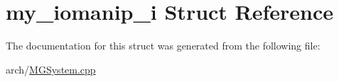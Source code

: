 \hypertarget{structmy__iomanip__i}{\section{my\+\_\+iomanip\+\_\+i Struct Reference}
\label{structmy__iomanip__i}
}


The documentation for this struct was generated from the following file\+:\begin{DoxyCompactItemize}
\item 
arch/\hyperlink{_m_g_system_8cpp}{M\+G\+System.\+cpp}\end{DoxyCompactItemize}
